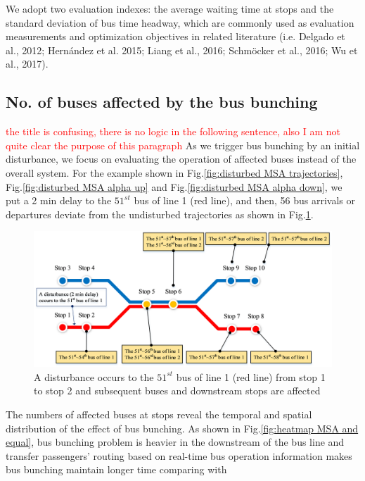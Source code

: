 \documentclass[smallextended]{svjour3}       %
\begin{document}
\begin{Abstract}
We adopt two evaluation indexes: 
the average waiting time at stops and the standard deviation of bus time headway, which are commonly used 
as evaluation measurements and optimization objectives in related literature (i.e. Delgado et al., 2012; Hernández et al. 2015; Liang et al., 2016; Schmöcker et al., 2016; Wu et al., 2017).



\subsection{No. of buses affected by the bus bunching}

\textcolor{red}{the title is confusing, there is no logic in the following sentence, 
also I am not quite clear the purpose of this paragraph}
As we trigger bus bunching by an initial disturbance, 
we focus on evaluating the operation of affected buses instead of the overall system.
For the example shown in Fig.\ref{fig:disturbed MSA trajectories}, Fig.\ref{fig:disturbed MSA alpha up} and Fig.\ref{fig:disturbed MSA alpha down}, 
we put a 2 min delay to the $51^{st}$ bus of line 1 (red line), 
and then, 56 bus arrivals or departures deviate from the undisturbed trajectories
as shown in Fig.\ref{fig:range}. 
\begin{figure}[H]
    \centering
    \includegraphics[width=0.9\linewidth]{CASPT2021paper_fig/range.png}
    \caption{A disturbance occurs to the $51^{st}$ bus of line 1 (red line) from stop 1 to stop 2 and subsequent buses and downstream stops are affected}
    \label{fig:range}
\end{figure}
The numbers of affected buses at stops reveal the temporal and spatial distribution of the effect of bus bunching.
As shown in Fig.\ref{fig:heatmap MSA and equal}, bus bunching problem is heavier in the downstream of the bus line and transfer passengers' routing based on real-time bus operation information makes bus bunching maintain longer time comparing with 

\end{Abstract}
\end{document}
